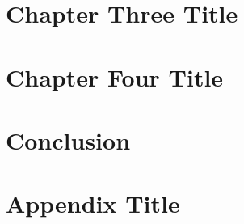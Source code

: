 \documentclass[12pt,twoside]{report}
\begin{document}
\chapter{Chapter Three Title}

 
\chapter{Chapter Four Title}

 
\chapter{Conclusion}


\appendix
\chapter{Appendix Title}

\end{document}
